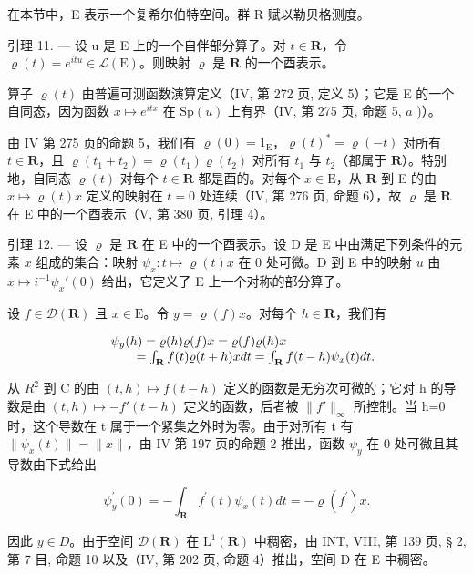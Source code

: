 在本节中，E 表示一个复希尔伯特空间。群 R 赋以勒贝格测度。

引理 11. --- 设 u 是 E 上的一个自伴部分算子。对 \(t \in \mathbf{R}\)，令 \(\varrho(t) = e^{itu} \in \mathcal{L}(\mathrm{E})\)。则映射 \(\varrho\) 是 \(\mathbf{R}\) 的一个酉表示。

算子 \(\varrho(t)\) 由普遍可测函数演算定义（IV, 第 272 页, 定义 5）；它是 E 的一个自同态，因为函数 \(x \mapsto e^{itx}\) 在 \(\mathrm{Sp}(u)\) 上有界（IV, 第 275 页, 命题 5, \(a\) )）。

由 IV 第 275 页的命题 5，我们有 \(\varrho(0) = 1_{\mathrm{E}}\)，\(\varrho(t)^* = \varrho(-t)\) 对所有 \(t \in \mathbf{R}\)，且 \(\varrho(t_1 + t_2) = \varrho(t_1)\varrho(t_2)\) 对所有 \(t_1\) 与 \(t_2\)（都属于 \(\mathbf{R}\)）。特别地，自同态 \(\varrho(t)\) 对每个 \(t \in \mathbf{R}\) 都是酉的。对每个 \(x \in \mathrm{E}\)，从 \(\mathbf{R}\) 到 E 的由 \(x \mapsto \varrho(t)x\) 定义的映射在 \(t = 0\) 处连续（IV, 第 276 页, 命题 6），故 \(\varrho\) 是 \(\mathbf{R}\) 在 E 中的一个酉表示（V, 第 380 页, 引理 4）。

引理 12. --- 设 \(\varrho\) 是 \(\mathbf{R}\) 在 E 中的一个酉表示。设 D 是 E 中由满足下列条件的元素 \(x\) 组成的集合：映射 \(\psi_x: t \mapsto \varrho(t)x\) 在 0 处可微。D 到 E 中的映射 \(u\) 由 \(x \mapsto i^{-1} \psi_x'(0)\) 给出，它定义了 E 上一个对称的部分算子。

设 \(f \in \mathcal{D}(\mathbf{R})\) 且 \(x \in \mathrm{E}\)。令 \(y = \varrho(f)x\)。对每个 \(h \in \mathbf{R}\)，我们有

\[
\begin{array}{r l} & {\psi_ {y} (h) = \varrho (h) \varrho (f) x = \varrho (f) \varrho (h) x} \\ & {\qquad = \int_ {\mathbf {R}} f (t) \varrho (t + h) x d t = \int_ {\mathbf {R}} f (t - h) \psi_ {x} (t) d t.} \end{array}
\]

从 \(R^{2}\) 到 C 的由 \((t,h)\mapsto f(t-h)\) 定义的函数是无穷次可微的；它对 h 的导数是由 \((t,h)\mapsto -f'(t-h)\) 定义的函数，后者被 \(\|f'\|_{\infty}\) 所控制。当 h=0 时，这个导数在 t 属于一个紧集之外时为零。由于对所有 t 有 \(\|\psi_{x}(t)\|=\|x\|\)，由 IV 第 197 页的命题 2 推出，函数 \(\psi_{y}\) 在 0 处可微且其导数由下式给出

\[
\psi_ {y} ^ {\prime} (0) = - \int_ {\mathbf {R}} f ^ {\prime} (t) \psi_ {x} (t) d t = - \varrho (f ^ {\prime}) x.
\]

因此 \(y \in D\)。由于空间 \(\mathcal{D}(\mathbf{R})\) 在 \(\mathrm{L}^{1}(\mathbf{R})\) 中稠密，由 INT, VIII, 第 139 页, § 2, 第 7 目, 命题 10 以及（IV, 第 202 页, 命题 4）推出，空间 D 在 E 中稠密。

